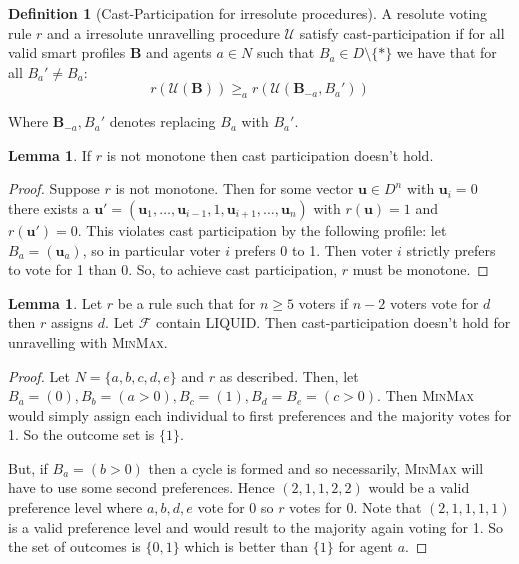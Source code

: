 \documentclass[11pt,a4paper, titlepage]{article}
\theoremstyle{definition}
\newtheorem{definition}[theorem]{Definition}
\newtheorem{lemma}[theorem]{Lemma}
\let\vec\mathbf
\begin{document}
\begin{definition}[Cast-Participation for irresolute procedures]
    A resolute voting rule $r$ and a irresolute unravelling procedure $\mathcal{U}$ satisfy cast-participation if for all valid smart profiles $\mathbf{B}$ and agents $a \in N$ such that $B_a \in D \setminus \{*\}$ we have that for all $B_a' \neq B_a$:
    \[
        r(\mathcal{U}(\mathbf{B})) \geq_a r(\mathcal{U}(\mathbf{B}_{-a}, B_a'))
    \]

    Where $\mathbf{B}_{-a}, B_a'$ denotes replacing $B_a$ with $B_a'$. 
\end{definition}

\begin{lemma} If $r$ is not monotone then cast participation doesn't hold.
\end{lemma}

\begin{proof}
    Suppose $r$ is not monotone. Then for some vector $\vec{u} \in D^n$ with $\vec{u}_i = 0$ there exists a $\vec{u}' = (\vec{u}_1, \ldots, \vec{u}_{i-1}, 1, \vec{u}_{i+1}, \ldots, \vec{u}_n )$ with $r(\vec{u}) = 1$ and $r(\vec{u}') = 0$. This violates cast participation by the following profile: let $B_a = (\vec{u}_a)$, so in particular voter $i$ prefers 0 to 1. Then voter $i$ strictly prefers to vote for 1 than 0. So, to achieve cast participation, $r$ must be monotone.
\end{proof}

\begin{lemma}
    Let $r$ be a rule such that for $n \geq 5$ voters if $n-2$ voters vote for $d$ then $r$ assigns $d$. Let $\mathcal{F}$ contain LIQUID. Then cast-participation doesn't hold for unravelling with \textsc{MinMax}.
\end{lemma}

\begin{proof}
    Let $N = \{a, b, c, d, e\}$ and $r$ as described. Then, let $B_a = (0), B_b = (a > 0), B_c = (1), B_d = B_e = (c > 0)$. Then \textsc{MinMax} would simply assign each individual to first preferences and the majority votes for 1. So the outcome set is $\{1\}$.

    But, if $B_a = (b > 0)$ then a cycle is formed and so necessarily, \textsc{MinMax} will have to use some second preferences. Hence $(2, 1, 1, 2, 2)$ would be a valid preference level where $a, b, d, e$ vote for $0$ so $r$ votes for $0$. Note that $(2, 1, 1, 1, 1)$ is a valid preference level and would result to the majority again voting for 1. So the set of outcomes is $\{0, 1\}$ which is better than $\{1\}$ for agent $a$.
\end{proof}
\end{document}
